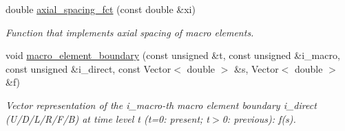 \begin{DoxyCompactItemize}
double \hyperlink{classoomph_1_1QuarterPipeDomain_a035e27884c0fa1bc31d1d9bed28c37bd}{axial\+\_\+spacing\+\_\+fct} (const double \&xi)
\begin{DoxyCompactList}\small\item\em Function that implements axial spacing of macro elements. \end{DoxyCompactList}\item 
void \hyperlink{classoomph_1_1QuarterPipeDomain_ae8cc6433c58dcfb265335744ed8a330a}{macro\+\_\+element\+\_\+boundary} (const unsigned \&t, const unsigned \&i\+\_\+macro, const unsigned \&i\+\_\+direct, const Vector$<$ double $>$ \&s, Vector$<$ double $>$ \&f)
\begin{DoxyCompactList}\small\item\em Vector representation of the i\+\_\+macro-\/th macro element boundary i\+\_\+direct (U/\+D/\+L/\+R/\+F/B) at time level t (t=0\+: present; t$>$0\+: previous)\+: f(s). \end{DoxyCompactList}\end{DoxyCompactItemize}
